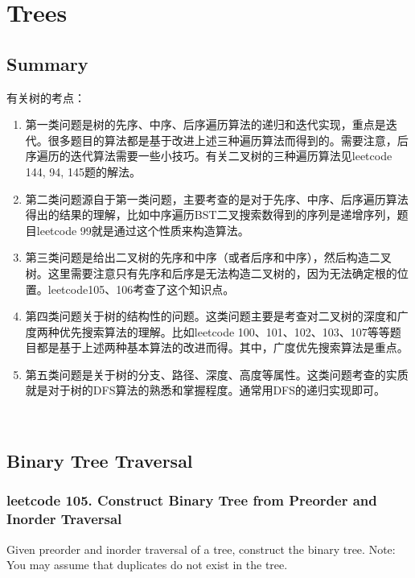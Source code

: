\documentclass[a4paper,10pt]{article}
\begin{document}
\section{Trees}

\subsection{Summary}
\begin{CJK*}{UTF8}{gbsn}
\noindent 有关树的考点：
\begin{enumerate}
    \item 第一类问题是树的先序、中序、后序遍历算法的递归和迭代实现，重点是迭代。很多题目的算法都是基于改进上述三种遍历算法而得到的。需要注意，后序遍历的迭代算法需要一些小技巧。有关二叉树的三种遍历算法见leetcode 144, 94, 145题的解法。
    
    \item 第二类问题源自于第一类问题，主要考查的是对于先序、中序、后序遍历算法得出的结果的理解，比如中序遍历BST二叉搜索数得到的序列是递增序列，题目leetcode 99就是通过这个性质来构造算法。
    
    \item 第三类问题是给出二叉树的先序和中序（或者后序和中序），然后构造二叉树。这里需要注意只有先序和后序是无法构造二叉树的，因为无法确定根的位置。leetcode105、106考查了这个知识点。
    
    \item 第四类问题关于树的结构性的问题。这类问题主要是考查对二叉树的深度和广度两种优先搜索算法的理解。比如leetcode 100、101、102、103、107等等题目都是基于上述两种基本算法的改进而得。其中，广度优先搜索算法是重点。
    
    \item 第五类问题是关于树的分支、路径、深度、高度等属性。这类问题考查的实质就是对于树的DFS算法的熟悉和掌握程度。通常用DFS的递归实现即可。
\end{enumerate}\\
\end{CJK*}

\subsection{Binary Tree Traversal}
\subsubsection{leetcode 105. Construct Binary Tree from Preorder and Inorder Traversal}
Given preorder and inorder traversal of a tree, construct the binary tree. Note: You may assume that duplicates do not exist in the tree. \\
\end{document}
